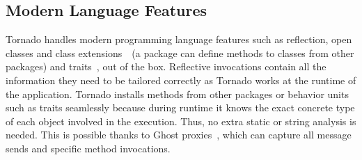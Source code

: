 \subsection{Modern Language Features}

Tornado handles modern programming language features such as reflection, open classes and class extensions~\cite{Berg03a}~(\ie a package can define methods to classes from other packages) and traits~\cite{Scha03a}, out of the box. Reflective invocations contain all the information they need to be tailored correctly as Tornado works at the runtime of the application. Tornado installs methods from other packages or behavior units such as traits seamlessly because during runtime it knows the exact concrete type of each object involved in the execution. Thus, no extra static or string analysis is needed. This is possible thanks to Ghost proxies~\cite{Mart11a}, which can capture all message sends and specific method invocations.


%


